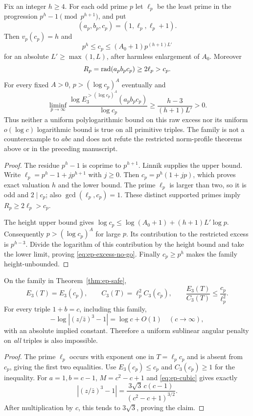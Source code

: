 \begin{theorem}
\label{thm:ep-safe}
Fix an integer $h\ge4$. For each odd prime $p$ let $\ell_p$ be the least
prime in the progression $p^h-1\pmod {p^{h+1}}$, and put
\[
 (a_p,b_p,c_p)=(1,\ell_p,\ell_p+1).
\]
Then $v_p(c_p)=h$ and
\[
 p^h\le c_p\le (A_0+1)p^{(h+1)L'}
\]
for an absolute $L'\ge\max(1,L)$, after harmless enlargement of $A_0$.
Moreover
\[
 R_p=\operatorname{rad}(a_pb_pc_p)\ge2\ell_p>c_p.
\]
For every fixed $A>0$, $p>(\log c_p)^A$ eventually and
\begin{equation}\label{eq:ep-excess-no-go}
 \liminf_{p\to\infty}
 \frac{\log E_3^{>(\log c_p)^A}(a_pb_pc_p)}{\log c_p}
 \ge\frac{h-3}{(h+1)L'}>0.
\end{equation}
Thus neither a uniform polylogarithmic bound on this raw excess nor its
uniform $o(\log c)$ logarithmic bound is true on all primitive triples.
The family is not a counterexample to $abc$ and does not refute the restricted
norm-profile theorems above or in the preceding manuscript.
\end{theorem}
\begin{proof}
The residue $p^h-1$ is coprime to $p^{h+1}$. Linnik supplies the upper bound.
Write $\ell_p=p^h-1+jp^{h+1}$ with $j\ge0$. Then
$c_p=p^h(1+jp)$, which proves exact valuation $h$ and the lower bound.
The prime $\ell_p$ is larger than two, so it is odd and $2\mid c_p$;
also $\gcd(\ell_p,c_p)=1$. These distinct supported primes imply
$R_p\ge2\ell_p>c_p$.

The height upper bound gives $\log c_p\le\log(A_0+1)+(h+1)L'\log p$.
Consequently $p>(\log c_p)^A$ for large $p$. Its contribution to the
restricted excess is $p^{h-3}$. Divide the logarithm of this contribution by
the height bound and take the lower limit, proving \eqref{eq:ep-excess-no-go}.
Finally $c_p\ge p^h$ makes the family height-unbounded.
\end{proof}

\begin{proposition}
\label{prop:ep-compensation}
On the family in Theorem~\ref{thm:ep-safe},
\[
 E_3(T)=E_3(c_p),\qquad C_3(T)=\ell_p^2C_3(c_p),\qquad
 \frac{E_3(T)}{C_3(T)}\le\frac{c_p}{\ell_p^2}.
\]
For every triple $1+b=c$, including this family,
\[
 -\log|(z/\bar z)^3-1|=\log c+O(1)
 \quad(c\to\infty),
\]
with an absolute implied constant. Therefore a uniform sublinear angular
penalty on \emph{all} triples is also impossible.
\end{proposition}
\begin{proof}
The prime $\ell_p$ occurs with exponent one in $T=\ell_pc_p$ and is absent
from $c_p$, giving the first two equalities. Use $E_3(c_p)\le c_p$ and
$C_3(c_p)\ge1$ for the inequality.
For $a=1,b=c-1$, $M=c^2-c+1$ and \eqref{eq:ep-cubic} gives exactly
\[
 |(z/\bar z)^3-1|=
 \frac{3\sqrt3\,c(c-1)}{(c^2-c+1)^{3/2}}.
\]
After multiplication by $c$, this tends to $3\sqrt3$, proving the claim.
\end{proof}

